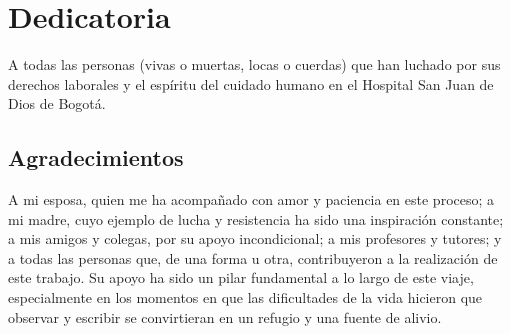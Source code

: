 \section*{Dedicatoria}

\vspace{2cm}

A todas las personas (vivas o muertas, locas o cuerdas) que han luchado por sus derechos laborales y el espíritu del cuidado humano en el Hospital San Juan de Dios de Bogotá.

\vspace{4cm}

\subsection*{Agradecimientos}
A mi esposa, quien me ha acompañado con amor y paciencia en este proceso; a mi madre, cuyo ejemplo de lucha y resistencia ha sido una inspiración constante; a mis amigos y colegas, por su apoyo incondicional; a mis profesores y tutores; y a todas las personas que, de una forma u otra, contribuyeron a la realización de este trabajo. Su apoyo ha sido un pilar fundamental a lo largo de este viaje, especialmente en los momentos en que las dificultades de la vida hicieron que observar y escribir se convirtieran en un refugio y una fuente de alivio.
\pagebreak